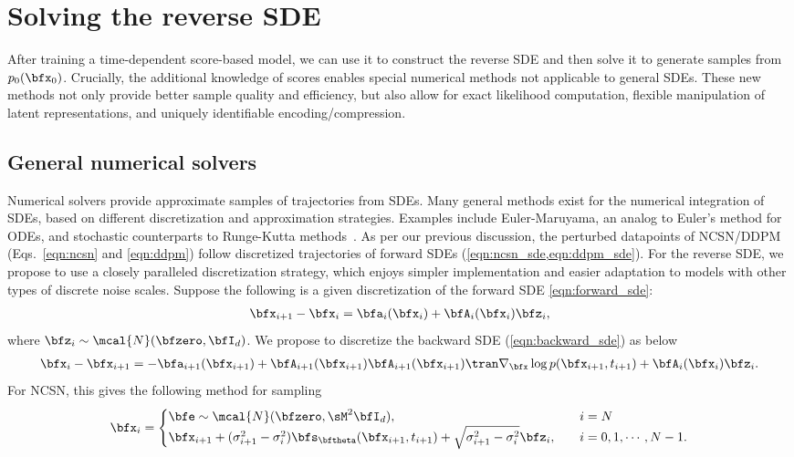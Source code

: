 \section{Solving the reverse SDE}
After training a time-dependent score-based model, we can use it to construct the reverse SDE and then solve it to generate samples from $p_0(\bfx_0)$. Crucially, the additional knowledge of scores enables special numerical methods not applicable to general SDEs. These new methods not only provide better sample quality and efficiency, but also allow for exact likelihood computation, flexible manipulation of latent representations, and uniquely identifiable encoding/compression.

\subsection{General numerical solvers}
Numerical solvers provide approximate samples of trajectories from SDEs. Many general methods exist for the numerical integration of SDEs, based on different discretization and approximation strategies. Examples include Euler-Maruyama, an analog to Euler's method for ODEs, and stochastic counterparts to Runge-Kutta methods~\citep{kloeden2013numerical}. As per our previous discussion, the perturbed datapoints of NCSN/DDPM (Eqs.~\eqref{eqn:ncsn} and \eqref{eqn:ddpm}) follow discretized trajectories of forward SDEs (\cref{eqn:ncsn_sde,eqn:ddpm_sde}). For the reverse SDE, we propose to use a closely paralleled discretization strategy, which enjoys simpler implementation and easier adaptation to models with other types of discrete noise scales. Suppose the following is a given discretization of the forward SDE \cref{eqn:forward_sde}:
\begin{align}
    \bfx_{i+1} - \bfx_i = \bfa_i(\bfx_i) + \bfA_i(\bfx_{i})\bfz_i, \label{eqn:discrete_forward}
\end{align}
where $\bfz_i \sim \mcal{N}(\bfzero, \bfI_d)$. We propose to discretize the backward SDE (\cref{eqn:backward_sde}) as below
\begin{align}
    \bfx_{i} - \bfx_{i+1} = -\bfa_{i+1}(\bfx_{i+1}) + \bfA_{i+1}(\bfx_{i+1})\bfA_{i+1}(\bfx_{i+1})\tran \nabla_\bfx \log p(\bfx_{i+1}, t_{i+1}) + \bfA_i(\bfx_{i}) \bfz_i. \label{eqn:discrete_backward}
\end{align}
For NCSN, this gives the following method for sampling
\begin{align}
    \bfx_i = \begin{cases}
        \bfe \sim \mcal{N}(\bfzero, \sM^2\bfI_d), &\quad i = N\label{eqn:ncsn_reverse_diffusion}\\
        \bfx_{i+1} + (\sigma_{i+1}^2 - \sigma_i^2) \bfs_\bftheta(\bfx_{i+1}, t_{i+1}) + \sqrt{\sigma_{i+1}^2 - \sigma_i^2} \bfz_i, &\quad i=0,1,\cdots,N-1.
    \end{cases}
\end{align}

